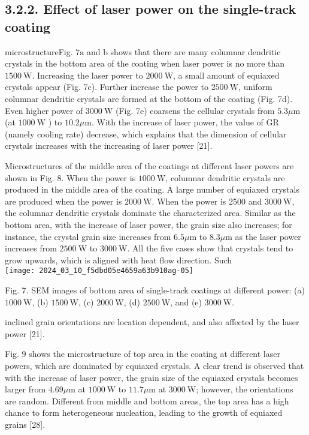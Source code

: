 \documentclass[10pt]{article}
\begin{document}
\subsection*{3.2.2. Effect of laser power on the single-track coating}
 microstructureFig. $7 \mathrm{a}$ and $\mathrm{b}$ shows that there are many columnar dendritic crystals in the bottom area of the coating when laser power is no more than $1500 \mathrm{~W}$. Increasing the laser power to $2000 \mathrm{~W}$, a small amount of equiaxed crystals appear (Fig. 7c). Further increase the power to $2500 \mathrm{~W}$, uniform columnar dendritic crystals are formed at the bottom of the coating (Fig. 7d). Even higher power of $3000 \mathrm{~W}$ (Fig. 7e) coarsens the cellular crystals from $5.3 \mu \mathrm{m}$ (at $1000 \mathrm{~W}$ ) to $10.2 \mu \mathrm{m}$. With the increase of laser power, the value of GR (namely cooling rate) decrease, which explains that the dimension of cellular crystals increases with the increasing of laser power [21].

Microstructures of the middle area of the coatings at different laser powers are shown in Fig. 8. When the power is $1000 \mathrm{~W}$, columnar dendritic crystals are produced in the middle area of the coating. A large number of equiaxed crystals are produced when the power is $2000 \mathrm{~W}$. When the power is 2500 and $3000 \mathrm{~W}$, the columnar dendritic crystals dominate the characterized area. Similar as the bottom area, with the increase of laser power, the grain size also increases; for instance, the crystal grain size increases from $6.5 \mu \mathrm{m}$ to $8.3 \mu \mathrm{m}$ as the laser power increases from $2500 \mathrm{~W}$ to $3000 \mathrm{~W}$. All the five cases show that crystals tend to grow upwards, which is aligned with heat flow direction. Such\\
\texttt{[image: 2024\_03\_10\_f5dbd05e4659a63b910ag-05]}

Fig. 7. SEM images of bottom area of single-track coatings at different power: (a) $1000 \mathrm{~W}$, (b) $1500 \mathrm{~W}$, (c) $2000 \mathrm{~W}$, (d) $2500 \mathrm{~W}$, and (e) $3000 \mathrm{~W}$.

inclined grain orientations are location dependent, and also affected by the laser power [21].

Fig. 9 shows the microstructure of top area in the coating at different laser powers, which are dominated by equiaxed crystals. A clear trend is observed that with the increase of laser power, the grain size of the equiaxed crystals becomes larger from $4.69 \mu \mathrm{m}$ at $1000 \mathrm{~W}$ to $11.7 \mu \mathrm{m}$ at $3000 \mathrm{~W}$; however, the orientations are random. Different from middle and bottom areas, the top area has a high chance to form heterogeneous nucleation, leading to the growth of equiaxed grains [28].
\end{document}
